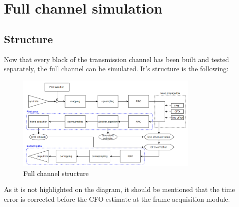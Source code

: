 \documentclass[10pt,a4paper]{ULBreport}
\begin{document}
 









\chapter{Full channel simulation}

\section{Structure}
Now that every block of the transmission channel has been built and tested separately, the full channel can be simulated. It's structure is the following:
\begin{figure}[H]
    \centering
    \includegraphics[width=0.8\textwidth]{pic/Full_channel.png}
    \caption{Full channel structure}
    \label{fig:full_channel}
\end{figure}

As it is not highlighted on the diagram, it should be mentioned that the time error is corrected before the CFO estimate at the frame acquisition module.
\vspace{-0.5cm}
\end{document}
